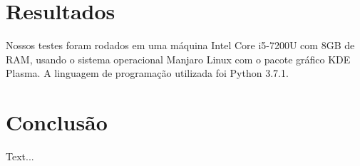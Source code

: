 \documentclass[sigconf]{acmart}
\begin{document}
\section{Resultados}

Nossos testes foram rodados em uma máquina Intel Core i5-7200U com 8GB de RAM, usando o sistema operacional 
Manjaro Linux com o pacote gráfico KDE Plasma. A linguagem de programação
utilizada foi Python 3.7.1.

\section{Conclusão}

Text...



\end{document}
